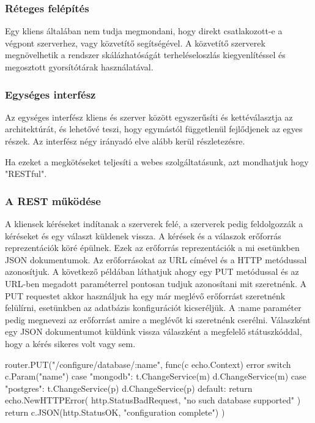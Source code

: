 \subsubsection{Réteges felépítés}
Egy kliens általában nem tudja megmondani, hogy direkt csatlakozott-e a végpont szerverhez, vagy közvetítő segítségével. A közvetítő szerverek megnövelhetik a rendszer skálázhatóságát terheléseloszlás kiegyenlítéssel és megosztott gyorsítótárak használatával.
\subsubsection{Egységes interfész}
Az egységes interfész kliens és szerver között egyszerűsíti és kettéválasztja az architektúrát, és lehetővé teszi, hogy egymástól függetlenül fejlődjenek az egyes részek. Az interfész négy irányadó elve alább kerül részletezésre.


Ha ezeket a megkötéseket teljesíti a webes szolgáltatásunk, azt mondhatjuk hogy "RESTful".


\subsubsection{A REST működése}
A kliensek kéréseket indítanak a szerverek felé, a szerverek pedig feldolgozzák a kéréseket és egy választ küldenek vissza.
A kérések és a válaszok erőforrás reprezentációk köré épülnek.
Ezek az erőforrás reprezentációk a mi esetünkben JSON dokumentumok.
Az erőforrásokat az URL címével és a HTTP metódussal azonosítjuk.
A következő példában láthatjuk ahogy egy PUT metódussal és az URL-ben megadott paraméterrel pontosan tudjuk azonosítani mit szeretnénk.
A PUT requestet akkor használjuk ha egy már meglévő erőforrást szeretnénk felülírni, esetünkben az adatbázis konfigurációt kicseréljük.
A :name paraméter pedig megnevezi az erőforrást amire a meglévőt ki szeretnénk cserélni.
Válaszként egy JSON dokumentumot küldünk vissza válaszként a megfelelő státuszkóddal, hogy a kérés sikeres volt vagy sem.

\begin{python}
    router.PUT("/configure/database/:name", func(c echo.Context) error {
        switch c.Param("name") {
            case "mongodb":
            t.ChangeService(m)
            d.ChangeService(m)
            case "postgres":
            t.ChangeService(p)
            d.ChangeService(p)
            default:
            return echo.NewHTTPError(
            http.StatusBadRequest,
            "no such database supported"
            )
        }
        return c.JSON(http.StatusOK, "configuration complete")
    })
\end{python}


